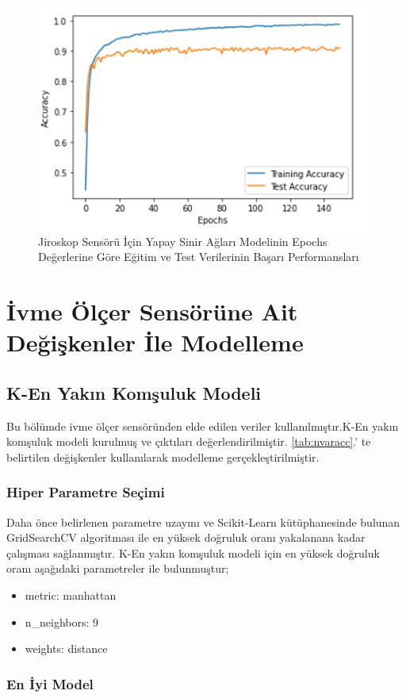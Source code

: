 \documentclass[12pt,twoside]{deuthesis}
\providecommand{\tightlist}{%
  \setlength{\itemsep}{0pt}\setlength{\parskip}{0pt}}
\begin{document}
\begin{figure}

{\centering \includegraphics[width=0.6\linewidth,height=0.25\textheight]{figure/ysa_testtrain} 

}

\caption{Jiroskop Sensörü İçin Yapay Sinir Ağları Modelinin Epochs Değerlerine Göre Eğitim ve Test Verilerinin Başarı Performansları}\label{fig:ysatesttrain}
\end{figure}
\hypertarget{ivme-uxf6luxe7er-sensuxf6ruxfcne-ait-deux11fiux15fkenler-ile-modelleme}{%
\section{İvme Ölçer Sensörüne Ait Değişkenler İle Modelleme}\label{ivme-uxf6luxe7er-sensuxf6ruxfcne-ait-deux11fiux15fkenler-ile-modelleme}}

\hypertarget{k-en-yakux131n-komux15fuluk-modeli}{%
\subsection{K-En Yakın Komşuluk Modeli}\label{k-en-yakux131n-komux15fuluk-modeli}}

Bu bölümde ivme ölçer sensöründen elde edilen veriler kullanılmıştır.K-En yakın komşuluk modeli kurulmuş ve çıktıları değerlendirilmiştir.
\ref{tab:nvaracc}.' te belirtilen değişkenler kullanılarak modelleme gerçekleştirilmiştir.

\hypertarget{hiper-parametre-seuxe7imi-4}{%
\subsubsection{Hiper Parametre Seçimi}\label{hiper-parametre-seuxe7imi-4}}

Daha önce belirlenen parametre uzayını ve Scikit-Learn kütüphanesinde bulunan GridSearchCV algoritması ile en yüksek doğruluk oranı yakalanana kadar çalışması sağlanmıştır.
K-En yakın komşuluk modeli için en yüksek doğruluk oranı aşağıdaki parametreler ile bulunmuştur;
\begin{itemize}
\tightlist
\item
  metric: manhattan
\item
  n\_neighbors: 9
\item
  weights: distance
\end{itemize}
\hypertarget{en-iyi-model-5}{%
\subsubsection{En İyi Model}\label{en-iyi-model-5}}
\end{document}
